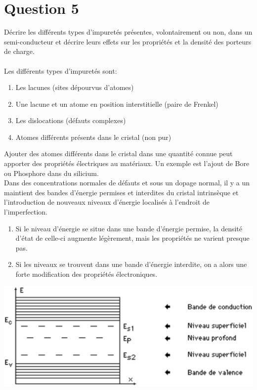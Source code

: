 \section{Question 5}
Décrire les différents types d'impuretés présentes, volontairement ou non, dans un semi-conducteur et décrire leurs effets  sur les propriétés et la densité des porteurs de charge.
\\
\hbox{}
\\
Les différents types d'impuretés sont:
\begin{enumerate}
\item Les lacunes (sites dépourvus d'atomes)
\item Une lacune et un atome en position interstitielle (paire de Frenkel)
\item Les dislocations (défauts complexes)
\item Atomes différents présents dans le cristal (non pur)
\end{enumerate}
Ajouter des atomes différents dans le cristal dans une quantité connue peut apporter des propriétés électriques au matériaux.  Un exemple est l'ajout de Bore ou Phosphore dans du silicium. \\Dans des concentrations normales de défauts et sous un dopage normal, il y a un maintient des bandes d'énergie permises et interdites du cristal intrinsèque et l'introduction de nouveaux niveaux d'énergie localisés à l'endroit de l'imperfection.
\begin{enumerate}
\item Si le niveau d'énergie se situe dans une bande d'énergie permise, la densité d'état de celle-ci augmente légèrement, mais les propriétés ne varient presque pas.
\item Si les niveaux se trouvent dans une bande d'énergie interdite, on a alors une forte modification des propriétés électroniques.
\end{enumerate}
\includegraphics[scale=0.3]{niv.eps} \\

